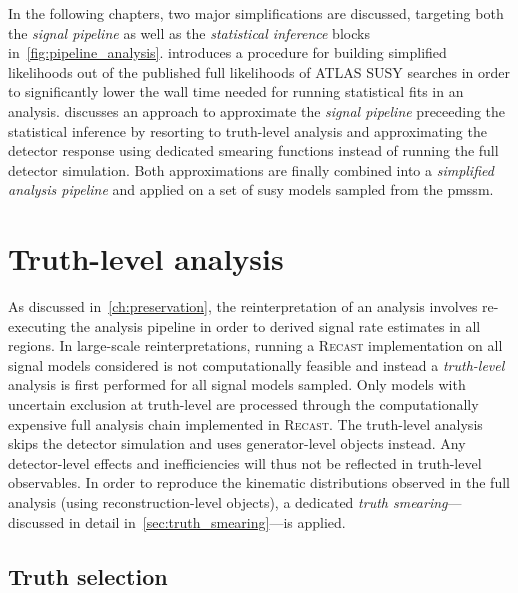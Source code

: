 In the following chapters, two major simplifications are discussed, targeting both the \textit{signal pipeline} as well as the \textit{statistical inference} blocks in~\cref{fig:pipeline_analysis}.  introduces a procedure for building simplified likelihoods out of the published full likelihoods of ATLAS SUSY searches in order to significantly lower the wall time needed for running statistical fits in an analysis.  discusses an approach to approximate the \textit{signal pipeline} preceeding the statistical inference by resorting to truth-level analysis and approximating the detector response using dedicated smearing functions instead of running the full detector simulation. Both approximations are finally combined into a \textit{simplified analysis pipeline} and applied on a set of \gls{susy} models sampled from the \gls{pmssm}. 


\ifpdf
    \graphicspath{{chapter-pmssm/Figs/Raster/}{chapter-pmssm/Figs/PDF/}{chapter-pmssm/Figs/}}
\else
    \graphicspath{{chapter-pmssm/Figs/Vector/}{chapter-pmssm/Figs/}}
\fi


\section{Truth-level analysis}\label{sec:truth_analysis}

As discussed in~\cref{ch:preservation}, the reinterpretation of an analysis involves re-executing the analysis pipeline in order to derived signal rate estimates in all regions. In large-scale reinterpretations, running a \textsc{Recast} implementation on all signal models considered is not computationally feasible and instead a \textit{truth-level} analysis is first performed for all signal models sampled. Only models with uncertain exclusion at truth-level are processed through the computationally expensive full analysis chain implemented in \textsc{Recast}. The truth-level analysis skips the detector simulation and uses generator-level objects instead. Any detector-level effects and inefficiencies will thus not be reflected in truth-level observables. In order to reproduce the kinematic distributions observed in the full analysis (using reconstruction-level objects), a dedicated \textit{truth smearing}---discussed in detail in~\cref{sec:truth_smearing}---is applied.

\subsection{Truth selection}\label{sec:truth_selection}

